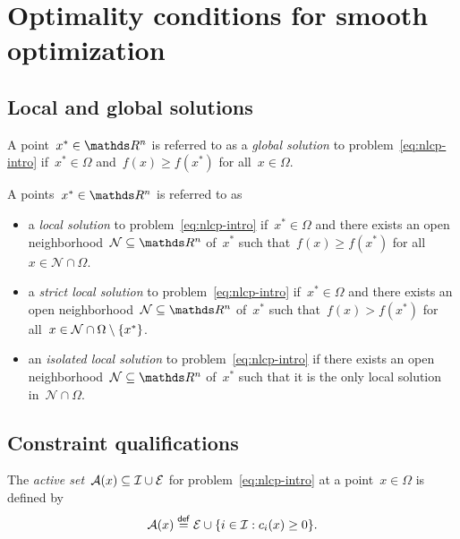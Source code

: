 \section{Optimality conditions for smooth optimization}

\subsection{Local and global solutions}

\begin{definition}
    A point~$x^{\ast} \in \R^n$ is referred to as a \emph{global solution} to problem~\cref{eq:nlcp-intro} if~$x^{\ast} \in \Omega$ and~$f(x) \ge f(x^{\ast})$ for all~$x \in \Omega$.
\end{definition}

\begin{definition}
    A points~$x^{\ast} \in \R^n$ is referred to as
    \begin{itemize}
        \item a \emph{local solution} to problem~\cref{eq:nlcp-intro} if~$x^{\ast} \in \Omega$ and there exists an open neighborhood~$\mathcal{N} \subseteq \R^n$ of~$x^{\ast}$ such that~$f(x) \ge f(x^{\ast})$ for all~$x \in \mathcal{N} \cap \Omega$.
        \item a \emph{strict local solution} to problem~\cref{eq:nlcp-intro} if~$x^{\ast} \in \Omega$ and there exists an open neighborhood~$\mathcal{N} \subseteq \R^n$ of~$x^{\ast}$ such that~$f(x) > f(x^{\ast})$ for all~$x \in \mathcal{N} \cap \Omega \setminus \{x^{\ast}\}$.
        \item an \emph{isolated local solution} to problem~\cref{eq:nlcp-intro} if there exists an open neighborhood~$\mathcal{N} \subseteq \R^n$ of~$x^{\ast}$ such that it is the only local solution in~$\mathcal{N} \cap \Omega$.
    \end{itemize}
\end{definition}

\subsection{Constraint qualifications}

\begin{definition}
    The \emph{active set}~$\mathcal{A}(x) \subseteq \mathcal{I} \cup \mathcal{E}$ for problem~\cref{eq:nlcp-intro} at a point~$x \in \Omega$ is defined by
    \begin{equation*}
        \mathcal{A}(x) \mathrel{\stackrel{\mathsf{def}}{=}} \mathcal{E} \cup \{i \in \mathcal{I} : c_{i}(x) \ge 0\}.
    \end{equation*}
\end{definition}

